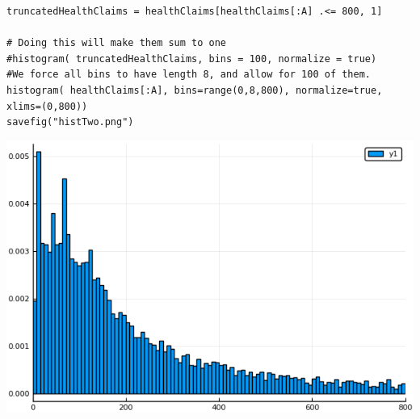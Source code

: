\documentclass[12pt, letterpaper]{paper}
\begin{document}
\begin{verbatim}
truncatedHealthClaims = healthClaims[healthClaims[:A] .<= 800, 1]

# Doing this will make them sum to one
#histogram( truncatedHealthClaims, bins = 100, normalize = true)
#We force all bins to have length 8, and allow for 100 of them.
histogram( healthClaims[:A], bins=range(0,8,800), normalize=true, xlims=(0,800))
savefig("histTwo.png")
\end{verbatim}

\begin{center}
\includegraphics[width=.9\linewidth]{histTwo.png}
\end{center}
\end{document}
